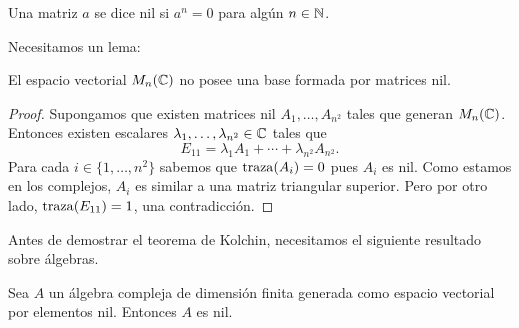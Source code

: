 Una matriz $a$ se dice nil si $a^n=0$ para algún $n\in\mathbb{N}$. 

Necesitamos un lema:

\begin{lemma}
	\label{lem:base_de_nilpotentes}
	El espacio vectorial $M_n(\mathbb{C})$ no posee una base formada por matrices
	nil.
\end{lemma}

\begin{proof}
	Supongamos que existen matrices nil $A_1,\dots,A_{n^2}$ tales que
	generan $M_n(\mathbb{C})$. Entonces existen escalares
	$\lambda_1,\dots,\lambda_{n^2}\in \mathbb{C}$ tales que
	\[
		E_{11}=\lambda_1A_1+\cdots+\lambda_{n^2}A_{n^2}.
	\]
	Para cada $i\in\{1,\dots,n^2\}$ sabemos que $\operatorname{traza}(A_i)=0$ pues $A_i$ es
	nil. Como estamos en los complejos, $A_i$ es similar a una
	matriz triangular superior. Pero por otro lado, $\operatorname{traza}(E_{11})=1$, una
	contradicción.
\end{proof}

Antes de demostrar el teorema de Kolchin, 
necesitamos el siguiente resultado sobre álgebras.  

\begin{theorem}[Wedderburn]
	Sea $A$ un álgebra compleja de dimensión finita generada como espacio vectorial por
	elementos nil. Entonces $A$ es nil.
\end{theorem}

